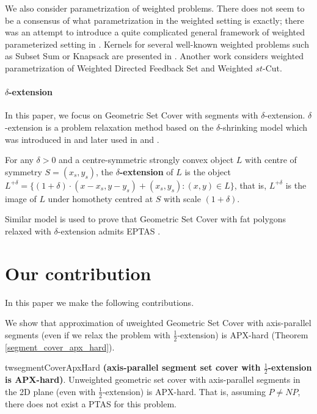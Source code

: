 We also consider parametrization of weighted problems.
There does not seem to be a consensus of what parametrization
in the weighted setting is exactly; there
was an attempt to introduce a quite complicated general
framework of weighted parameterized setting in \cite{weighted_framework}.
Kernels for several well-known weighted problems
such as Subset Sum or Knapsack are presented in \cite{kernel_weighted}.
Another work \cite{weighted_flow} considers weighted
parametrization of Weighted Directed Feedback Set and Weighted $st$-Cut.

\paragraph{$\delta$-extension}
In this paper, we focus on Geometric Set Cover with segments with $\delta$-extension.
$\delta$-extension is a problem relaxation method based on the
$\delta$-shrinking model which was introduced in \cite{shrinking_original}
and later used in \cite{shrinking2} and \cite{shrinking1}.

\begin{defi}
\label{definition:delta_extension}
For any $\delta > 0$ and a centre-symmetric strongly convex object $L$ with
centre of symmetry $S = (x_s, y_s)$,
the \textbf{$\delta$-extension} of $L$ is the object $L^{+\delta} =
\{(1 + \delta)\cdot(x - x_s, y - y_s) + (x_s, y_s) : (x, y) \in L\}$,
that is, $L^{+\delta}$ is the image of $L$ under homothety centred
at $S$ with scale $(1+\delta)$.
\end{defi}

Similar model is used to prove that Geometric Set Cover with fat polygons
relaxed with $\delta$-extension admits EPTAS \cite{harpeled12}.

\section*{Our contribution}
In this paper we make the following contributions.

We show that approximation of uweighted Geometric Set Cover with axis-parallel segments
(even if we relax the problem with  $\frac{1}{2}$-extension) is APX-hard
(Theorem \ref{segment_cover_apx_hard}).

\begin{restatable}{tw}{segmentCoverApxHard}{
\label{segment_cover_apx_hard}
	\textbf{(axis-parallel segment set cover with $\frac{1}{2}$-extension is APX-hard)}.	
	Unweighted geometric set cover
	with axis-parallel segments in the 2D plane
	(even with $\frac{1}{2}$-extension) is APX-hard.
	That is, assuming $P\neq NP$, there does not exist a PTAS
	for this problem.
}\end{restatable}

